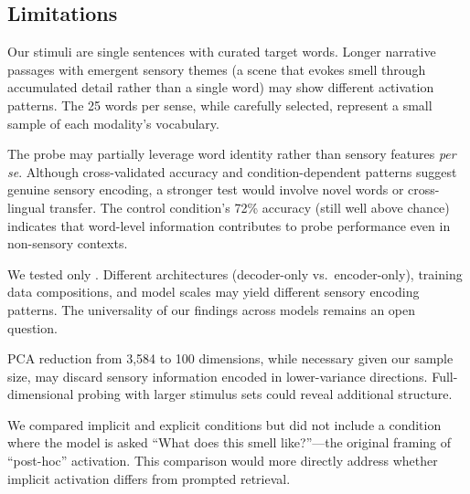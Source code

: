 \subsection{Limitations}
\label{sec:limitations}

Our stimuli are single sentences with curated target words. Longer narrative passages with emergent sensory themes (\eg a scene that evokes smell through accumulated detail rather than a single word) may show different activation patterns. The 25 words per sense, while carefully selected, represent a small sample of each modality's vocabulary.

The probe may partially leverage word identity rather than sensory features \textit{per se}. Although cross-validated accuracy and condition-dependent patterns suggest genuine sensory encoding, a stronger test would involve novel words or cross-lingual transfer. The control condition's 72\% accuracy (still well above chance) indicates that word-level information contributes to probe performance even in non-sensory contexts.

We tested only \qwen. Different architectures (decoder-only vs.\ encoder-only), training data compositions, and model scales may yield different sensory encoding patterns. The universality of our findings across models remains an open question.

PCA reduction from 3,584 to 100 dimensions, while necessary given our sample size, may discard sensory information encoded in lower-variance directions. Full-dimensional probing with larger stimulus sets could reveal additional structure.

We compared implicit and explicit conditions but did not include a condition where the model is asked ``What does this smell like?''---the original framing of ``post-hoc'' activation. This comparison would more directly address whether implicit activation differs from prompted retrieval.

